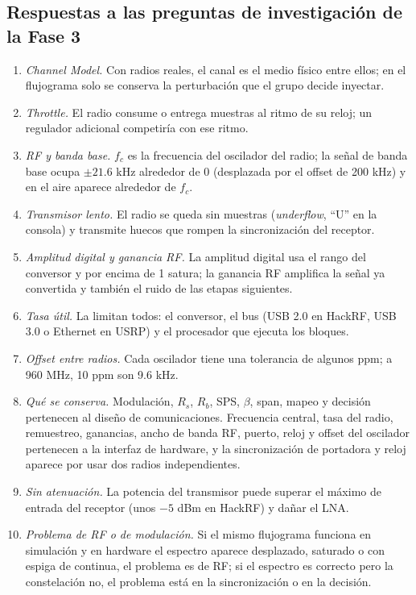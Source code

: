 \subsection{Respuestas a las preguntas de investigación de la Fase 3}
\label{app:preguntas}
\begin{enumerate}
    \item \emph{Channel Model.} Con radios reales, el canal es el medio físico entre ellos; en el flujograma solo se conserva la perturbación que el grupo decide inyectar.
    \item \emph{Throttle.} El radio consume o entrega muestras al ritmo de su reloj; un regulador adicional competiría con ese ritmo.
    \item \emph{RF y banda base.} $f_c$ es la frecuencia del oscilador del radio; la señal de banda base ocupa $\pm21.6$ kHz alrededor de 0 (desplazada por el offset de 200 kHz) y en el aire aparece alrededor de $f_c$.
    \item \emph{Transmisor lento.} El radio se queda sin muestras (\emph{underflow}, ``U'' en la consola) y transmite huecos que rompen la sincronización del receptor.
    \item \emph{Amplitud digital y ganancia RF.} La amplitud digital usa el rango del conversor y por encima de 1 satura; la ganancia RF amplifica la señal ya convertida y también el ruido de las etapas siguientes.
    \item \emph{Tasa útil.} La limitan todos: el conversor, el bus (USB 2.0 en HackRF, USB 3.0 o Ethernet en USRP) y el procesador que ejecuta los bloques.
    \item \emph{Offset entre radios.} Cada oscilador tiene una tolerancia de algunos ppm; a 960 MHz, 10 ppm son 9.6 kHz.
    \item \emph{Qué se conserva.} Modulación, $R_s$, $R_b$, SPS, $\beta$, span, mapeo y decisión pertenecen al diseño de comunicaciones. Frecuencia central, tasa del radio, remuestreo, ganancias, ancho de banda RF, puerto, reloj y offset del oscilador pertenecen a la interfaz de hardware, y la sincronización de portadora y reloj aparece por usar dos radios independientes.
    \item \emph{Sin atenuación.} La potencia del transmisor puede superar el máximo de entrada del receptor (unos $-5$ dBm en HackRF) y dañar el LNA.
    \item \emph{Problema de RF o de modulación.} Si el mismo flujograma funciona en simulación y en hardware el espectro aparece desplazado, saturado o con espiga de continua, el problema es de RF; si el espectro es correcto pero la constelación no, el problema está en la sincronización o en la decisión.
\end{enumerate}

